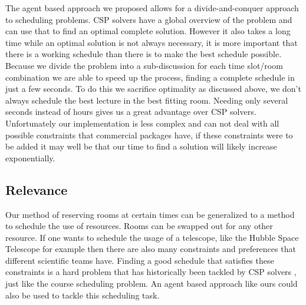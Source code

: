 The agent based approach we proposed allows for a divide-and-conquer approach to
scheduling problems. CSP solvers have a global overview of the problem and can
use that to find an optimal complete solution. However it also takes a long time
while an optimal solution is not always necessary, it is more important that
there is a working schedule than there is to make the best schedule possible.
Because we divide the problem into a sub-discussion for each time slot/room
combination we are able to speed up the process, finding a complete schedule in
just a few seconds. To do this we sacrifice optimality as discussed above, we
don't always schedule the best lecture in the best fitting room. Needing only
several seconds instead of hours gives us a great advantage over CSP solvers.
Unfortunately our implementation is less complex and can not deal with all
possible constraints that commercial packages have, if these constraints were to
be added it may well be that our time to find a solution will likely increase
exponentially.

\subsection{Relevance}
Our method of reserving rooms at certain times can be generalized to a method to
schedule the use of resources. Rooms can be swapped out for any other resource.
If one wants to schedule the usage of a telescope, like the Hubble Space
Telescope for example then there are also many constraints and preferences that
different scientific teams have. Finding a good schedule that satisfies these
constraints is a hard problem that has historically been tackled by CSP solvers
\cite{johnston1994spike}, just like the course scheduling problem. An agent
based approach like ours could also be used to tackle this scheduling task.
